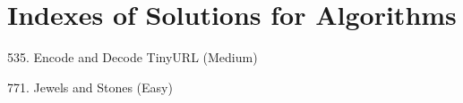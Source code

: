 \section*{Indexes of Solutions for Algorithms}
\label{sec:algo_ind}

\begin{flushleft}
535. Encode and Decode TinyURL (Medium)\hfill\pageref{algo:535}

771. Jewels and Stones (Easy)\hfill\pageref{algo:771}
\end{flushleft}

\newpage
